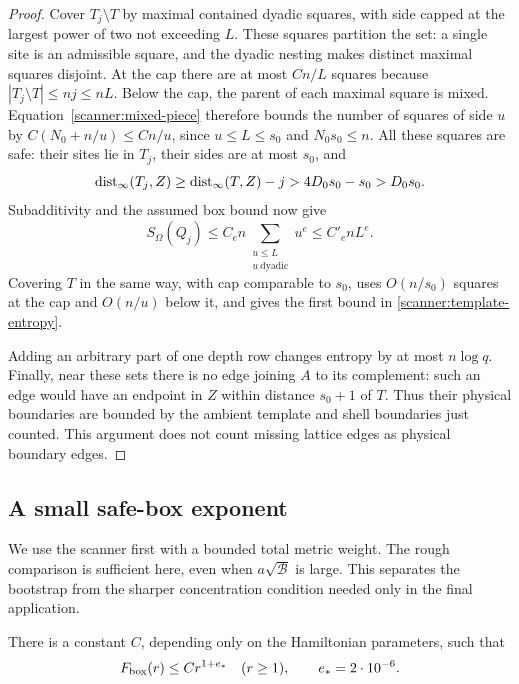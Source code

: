\begin{proof}
Cover \(T_j\setminus T\) by maximal contained dyadic squares, with side
capped at the largest power of two not exceeding \(L\).  These squares
partition the set: a single site is an admissible square, and the dyadic
nesting makes distinct maximal squares disjoint.  At the cap there are
at most \(Cn/L\) squares because
\(|T_j\setminus T|\le nj\le nL\).  Below the cap, the parent of each
maximal square is mixed.  Equation~\eqref{scanner:mixed-piece} therefore
bounds the number of squares of side \(u\) by
\(C(N_0+n/u)\le Cn/u\), since \(u\le L\le s_0\) and
\(N_0s_0\le n\).  All these squares are safe: their sites lie in
\(T_j\), their sides are at most \(s_0\), and
\[
 \operatorname{dist}_\infty(T_j,Z)\ge\operatorname{dist}_\infty(T,Z)-j
   >4D_0s_0-s_0>D_0s_0.
\]
Subadditivity and the assumed box bound now give
\[
 S_\Omega(Q_j)
 \le C_e n\sum_{\substack{u\le L\\u\ \mathrm{dyadic}}}u^e
 \le C'_e nL^e.
\]
Covering \(T\) in the same way, with cap comparable to \(s_0\),
uses \(O(n/s_0)\) squares at the cap and \(O(n/u)\) below it, and
gives the first bound in \eqref{scanner:template-entropy}.

Adding an arbitrary part of one depth row changes entropy by at most
\(n\log q\).  Finally, near these sets there is no edge joining \(A\)
to its complement: such an edge would have an endpoint in \(Z\) within
distance \(s_0+1\) of \(T\).  Thus their physical boundaries are bounded
by the ambient template and shell boundaries just counted.  This argument
does not count missing lattice edges as physical boundary edges.
\end{proof}

\subsection{A small safe-box exponent}

We use the scanner first with a bounded total metric weight.  The rough
comparison is sufficient here, even when \(a\sqrt{\mathcal B}\) is
large.  This separates the bootstrap from the sharper concentration
condition needed only in the final application.

\begin{proposition}
\label{prop:small-box}
There is a constant \(C\), depending only on the Hamiltonian parameters,
such that
\[
 F_{\rm box}(r)\le Cr^{1+e_*}\quad(r\ge1),
 \qquad e_*=2\cdot10^{-6}.
\]
\end{proposition}

